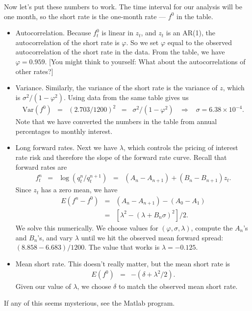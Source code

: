\documentclass[11pt]{article}
\begin{document}
Now let's put these numbers to work.
The time interval for our analysis will be one month,
so the short rate is the one-month rate --- $f^0$ in the table.
%
\begin{itemize}
\item Autocorrelation.  Because $f^0_t$ is linear in $z_t$, and $z_t$ is an AR(1),
the autocorrelation of the short rate is $\varphi$.
So we set $\varphi$ equal to the observed autocorrelation of the short rate in the data.
From the table, we have $\varphi = 0.959$.
[You might think to yourself:  What about the autocorrelations of other rates?]

\item Variance.  Similarly, the variance of the short rate is the variance of $z$,
which is $ \sigma^2/(1-\varphi^2)$.
Using data from the same table gives us
\begin{eqnarray*}
    \mbox{Var}(f^0) &=& \left( 2.703/1200 \right)^2
            \;\;=\;\; \sigma^2/(1-\varphi^2)
            \;\;\;\Rightarrow\;\;\; \sigma = 6.38 \times 10^{-4} .
\end{eqnarray*}
Note that we have converted the numbers in the table from annual percentages
to monthly interest.

\item Long forward rates.  Next we have $\lambda$, which controls the pricing of
interest rate risk and therefore the slope of the forward rate curve.
Recall that forward rates are
\begin{eqnarray*}
    f^n_t &=& \log (q^n_t/q^{n+1}_t)
                \;\;=\;\;  (A_n - A_{n+1}) + (B_n - B_{n+1}) z_t .
\end{eqnarray*}
Since $z_t$ has a zero mean,  we have
\begin{eqnarray*}
    E (f^n - f^0) &=&  (A_n - A_{n+1}) - (A_0 - A_{1}) \\
            &=&  \left[ \lambda^2 - (\lambda + B_n\sigma)^2 \right] / 2 .
\end{eqnarray*}
We solve this numerically.
We choose values for $(\varphi, \sigma, \lambda)$,
compute the $A_n$'s and $B_n$'s, and vary $\lambda$ until
we hit the observed mean forward spread:
$(8.858-6.683)/1200$.
The value that works is $\lambda = -0.125$.

\item Mean short rate.  This doesn't really matter, but
the mean short rate is
\begin{eqnarray*}
    E (f^0) &=&  - (\delta + \lambda^2/2) .
\end{eqnarray*}
Given our value of $\lambda$, we choose $\delta$ to match
the observed mean short rate.

\end{itemize}
If any of this seems mysterious, see the Matlab program.
\end{document}
